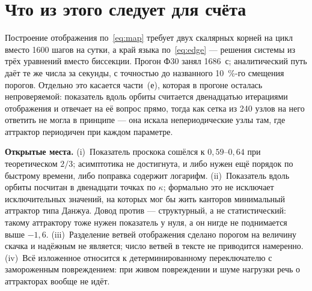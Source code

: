 \documentclass[11pt,a4paper]{article}
\begin{document}
\section{Что из этого следует для счёта}
Построение отображения по~\eqref{eq:map} требует двух скалярных корней на цикл вместо 1600 шагов на
сутки, а край языка по~\eqref{eq:edge} --- решения системы из трёх уравнений вместо биссекции.
Прогон Ф30 занял 1686~с; аналитический путь даёт те же числа за секунды, с точностью до названного
10~\%-го смещения порогов. Отдельно это касается части~(е), которая в прогоне осталась
непроверяемой: показатель вдоль орбиты считается двенадцатью итерациями отображения и отвечает на её
вопрос прямо, тогда как сетка из 240 узлов на него ответить не могла в принципе --- она искала
непериодические узлы там, где аттрактор периодичен при каждом параметре.

\smallskip\noindent\textbf{Открытые места.} (i)~Показатель проскока сошёлся к $0{,}59$--$0{,}64$ при
теоретическом $2/3$; асимптотика не достигнута, и либо нужен ещё порядок по быстрому времени, либо
поправка содержит логарифм. (ii)~Показатель вдоль орбиты посчитан в двенадцати точках по $\kappa$;
формально это не исключает исключительных значений, на которых мог бы жить канторов минимальный
аттрактор типа Данжуа. Довод против --- структурный, а не статистический: такому аттрактору тоже
нужен показатель у нуля, а он нигде не поднимается выше $-1{,}6$. (iii)~Разделение ветвей
отображения сделано порогом на величину скачка и надёжным не является; число ветвей в тексте не
приводится намеренно. (iv)~Всё изложенное относится к детерминированному переключателю с замороженным
повреждением: при живом повреждении и шуме нагрузки речь о аттракторах вообще не идёт.
\end{document}
